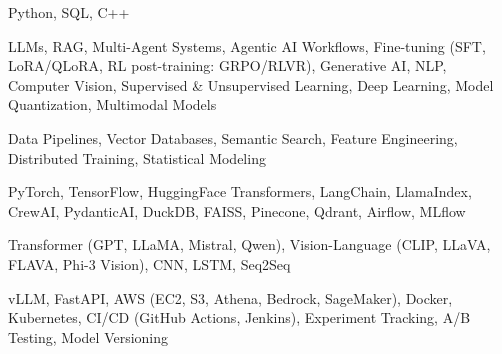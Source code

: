\documentclass[letter,10pt]{article}
\begin{document}
 Python, SQL, C++\par\vspace{2pt}

 LLMs, RAG, Multi-Agent Systems, Agentic AI Workflows, Fine-tuning (SFT, LoRA/QLoRA, RL post-training: GRPO/RLVR), Generative AI, NLP, Computer Vision, Supervised \& Unsupervised Learning, Deep Learning, Model Quantization, Multimodal Models\par\vspace{2pt}

 Data Pipelines, Vector Databases, Semantic Search, Feature Engineering, Distributed Training, Statistical Modeling\par\vspace{2pt}

 PyTorch, TensorFlow, HuggingFace Transformers, LangChain, LlamaIndex, CrewAI, PydanticAI, DuckDB, FAISS, Pinecone, Qdrant, Airflow, MLflow\par\vspace{2pt}

 Transformer (GPT, LLaMA, Mistral, Qwen), Vision-Language (CLIP, LLaVA, FLAVA, Phi-3 Vision), CNN, LSTM, Seq2Seq\par\vspace{2pt}

 vLLM, FastAPI, AWS (EC2, S3, Athena, Bedrock, SageMaker), Docker, Kubernetes, CI/CD (GitHub Actions, Jenkins), Experiment Tracking, A/B Testing, Model Versioning
\end{document}
